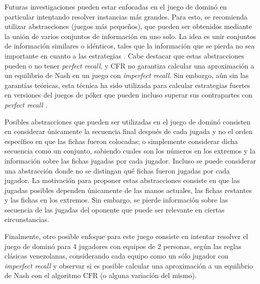 Futuras investigaciones pueden estar enfocadas en el juego de dominó en particular intentando resolver instancias más grandes. Para esto, se recomienda utilizar abstracciones (juegos más pequeños), que pueden ser obtenidos mediante la unión de varios conjuntos de información en uno solo. La idea es unir conjuntos de información similares o idénticos, tales que la información que se pierda no sea importante en cuanto a las estrategias \cite[pp.~71-72]{bib:thesis-marc-lanctot}. Cabe destacar que estas abstracciones pueden o no tener \textit{perfect recall}, y CFR no garantiza calcular una aproximación a un equilibrio de Nash en un juego con \textit{imperfect recall}. Sin embargo, aún sin las garantías teóricas, esta técnica ha sido utilizada para calcular estrategias fuertes en versiones del juegos de póker que pueden incluso superar sus contrapartes con \textit{perfect recall} \cite{bib:imperfect-recall}.

Posibles abstracciones que pueden ser utilizadas en el juego de dominó consisten en considerar únicamente la secuencia final después de cada jugada y no el orden específico en que las fichas fueron colocadas; o simplemente considerar dicha secuencia como un conjunto, sabiendo cuales son los números en los extremos y la información sobre las fichas jugadas por cada jugador. Incluso se puede considerar una abstracción donde no se distingan qué fichas fueron jugadas por cada jugador. La motivación para proponer estas abstracciones consiste en que las jugadas posibles dependen únicamente de las manos actuales, las fichas restantes y las fichas en los extremos. Sin embargo, se pierde información sobre las secuencia de las jugadas del oponente que puede ser relevante en ciertas circunstancias.

Finalmente, otro posible enfoque para este juego consiste en intentar resolver el juego de dominó para 4 jugadores con equipos de 2 personas, según las reglas clásicas venezolanas, considerando cada equipo como un sólo jugador con \textit{imperfect recall} y observar si es posible calcular una aproximación a un equilibrio de Nash con el algoritmo CFR (o alguna variación del mismo).
